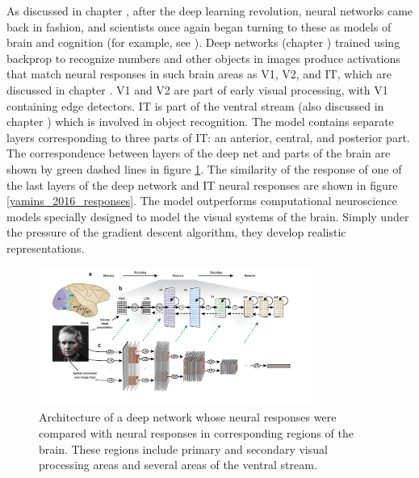 As discussed in chapter , after the deep learning revolution, neural networks came back in fashion, and scientists once again began turning to these as models of brain and cognition (for example, see  \cite{yamins2014performance, yamins2016using}). Deep networks (chapter ) trained using backprop to recognize numbers and other objects in images produce activations that match neural responses in such brain areas as V1, V2, and IT, which are discussed in chapter .  V1 and V2 are part of early visual processing, with V1 containing edge detectors. IT is part of the ventral stream (also discussed in chapter ) which is involved in object recognition. The model contains separate layers corresponding to three parts of IT: an anterior, central, and posterior part. The correspondence between layers of the deep net and parts of the brain are shown by green dashed lines in figure \ref{yamins_2016_architecture}.  The similarity of the response of one of the last layers of the deep network and IT neural responses are shown in figure \ref{yamins_2016_responses}.  The model outperforms computational neuroscience models specially designed to model the visual systems of the brain. Simply under the pressure of the gradient descent algorithm, they develop realistic representations. 

\begin{figure}[h]
\centering
\includegraphics[width=0.8\textwidth]{images/deepNetYaminsArchitecture_2016.png}
\caption[Yamins.]{Architecture of a deep network whose neural responses were compared with neural responses in corresponding regions of the brain. These regions include primary and secondary visual processing areas and several areas of the ventral stream.}
\label{yamins_2016_architecture}
\end{figure}


